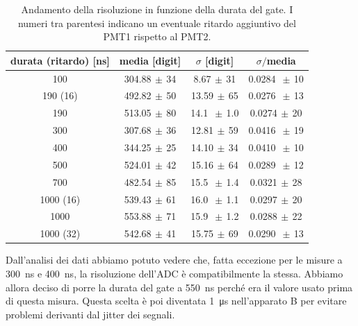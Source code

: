 \begin{table}[h]
\centering
\begin{tabular}{c|c|c|c}
durata (ritardo) [ns] & media [digit] & $\sigma$ [digit] & $\sigma\!/$\!media\\
\hline
 100 & 304.88$\,\pm\,$34 &  8.67$\,\pm\,$31 & 0.0284 $\,\pm\,$10 \\  
 190 (16) & 492.82$\,\pm\,$50 & 13.59$\,\pm\,$65 & 0.0276 $\,\pm\,$13 \\
 190 & 513.05$\,\pm\,$80 & 14.1 $\,\pm\,$1.0 & 0.0274$\,\pm\,$20 \\
 300 & 307.68$\,\pm\,$36 & 12.81$\,\pm\,$59 & 0.0416 $\,\pm\,$19 \\
 400 & 344.25$\,\pm\,$25 & 14.10$\,\pm\,$34 & 0.0410 $\,\pm\,$10 \\
 500 & 524.01$\,\pm\,$42 & 15.16$\,\pm\,$64 & 0.0289 $\,\pm\,$12 \\
 700 & 482.54$\,\pm\,$85 & 15.5 $\,\pm\,$1.4 & 0.0321$\,\pm\,$28 \\
1000 (16) & 539.43$\,\pm\,$61 & 16.0 $\,\pm\,$1.1 & 0.0297$\,\pm\,$20 \\
1000 & 553.88$\,\pm\,$71 & 15.9 $\,\pm\,$1.2 & 0.0288$\,\pm\,$22 \\
1000 (32) & 542.68$\,\pm\,$41 & 15.75$\,\pm\,$69 & 0.0290 $\,\pm\,$13 
\end{tabular}

\caption{Andamento della risoluzione in funzione della durata del gate. I numeri tra parentesi indicano un eventuale ritardo aggiuntivo del PMT1 rispetto al PMT2.}
\label{tab:gate}
\end{table}

Dall'analisi dei dati abbiamo potuto vedere che, fatta eccezione per le misure a \SI{300}{ns} e \SI{400}{ns}, la risoluzione dell'ADC è compatibilmente la stessa.
Abbiamo allora deciso di porre la durata del gate a \SI{550}{ns} perché era il valore usato prima di questa misura.
Questa scelta è poi diventata \SI{1}{\micro s} nell'apparato B per evitare problemi derivanti dal jitter dei segnali.